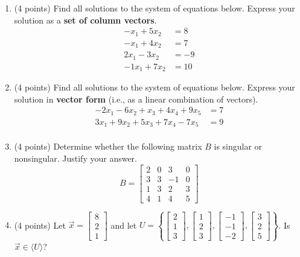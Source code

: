 \documentclass[11pt]{article}
\theoremstyle{definition}
\begin{document}
\begin{enumerate}
\item (4 points) Find all solutions to the system of equations below.  Express your solution as a \textbf{set of column vectors}.
\begin{align*}
-x_{1}+5x_{2} & = 8\\
-x_{1}+4x_{2} & = 7\\
2x_{1}-3x_{2} & = -9\\
-1x_{1}+7x_{2} & = 10
\end{align*}

\item (4 points) Find all solutions to the system of equations below.  Express your solution in \textbf{vector form} (i.e., as a linear combination of vectors).
\begin{align*}
-2x_{1}-6x_{2}+x_{3}+4x_{4}+9x_{5} & = 7\\
3x_{1}+9x_{2}+5x_{3}+7x_{4}-7x_{5} & = 9\\
\end{align*}

\item (4 points)  Determine whether the following matrix $B$ is singular or nonsingular.  Justify your answer.
\[B=\begin{bmatrix}
2 & 0 & 3 & 0\\
3 & 3 & -1 & 0\\
1 & 3 & 2 & 3\\
4 & 1 & 4 & 5
\end{bmatrix}\]

\item (4 points) Let $\displaystyle \vec{x}=\begin{bmatrix}8\\ 2\\ 1\end{bmatrix}$ and let $\displaystyle U= \left\{\begin{bmatrix} 2\\ 1\\ 3\end{bmatrix}, \begin{bmatrix} 1\\ 2\\ 3\end{bmatrix}, \begin{bmatrix} -1\\ -1\\ -2\end{bmatrix}, \begin{bmatrix} 3\\ 2\\ 5\end{bmatrix}\right\}$.  Is $\vec{x}\in \langle U\rangle$?


\end{enumerate}
\end{document}
